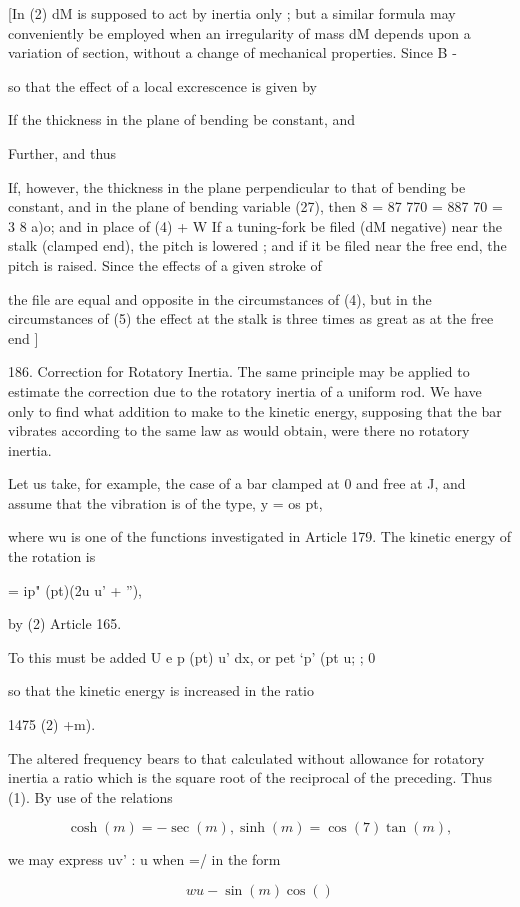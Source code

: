 [In (2) dM is supposed to act by inertia only ; but a similar
formula may conveniently be employed when an irregularity of
mass dM depends upon a variation of section, without a change
of mechanical properties. Since B -

so that the effect of a local excrescence is given by

If the thickness in the plane of bending be constant,
and

Further,
and thus

If, however, the thickness in the plane perpendicular to that of
bending be constant, and in the plane of bending variable (27),
then 8 = 87 770 = 887 70 = 3 8 a)o;
and in place of (4)
+ W
If a tuning-fork be filed (dM negative) near the stalk (clamped end),
the pitch is lowered ; and if it be filed near the free end, the
pitch is raised. Since the effects of a given stroke of

the file are equal and opposite in the circumstances of (4), but in
the circumstances of (5) the effect at the stalk is three times as
great as at the free end ]

186. Correction for Rotatory Inertia.
The same principle may be applied to estimate the correction due to
the rotatory inertia of a uniform rod. We have only to find what
addition to make to the kinetic energy, supposing that the bar vibrates
according to the same law as would obtain, were there no rotatory
inertia.

Let us take, for example, the case of a bar clamped at 0 and free at J,
and assume that the vibration is of the type, y = os pt,

where wu is one of the functions investigated in Article 179. The
kinetic energy of the rotation is

= ip" (pt)(2u u' + ''),

by (2) Article 165.

To this must be added U e p
(pt) u' dx, or pet `p' (pt u; ; 0

so that the kinetic energy is increased in the ratio

1475 (2) +m).

The altered frequency bears to that calculated without allowance for
rotatory inertia a ratio which is the square root of the reciprocal of
the preceding. Thus (1). By use of the relations

\[\cosh(m) = - \sec(m), \sinh(m) = \cos(7) \tan(m),\]

we may express uv' : u when =/ in the form

\[wu - \sin(m) \cos() \]

